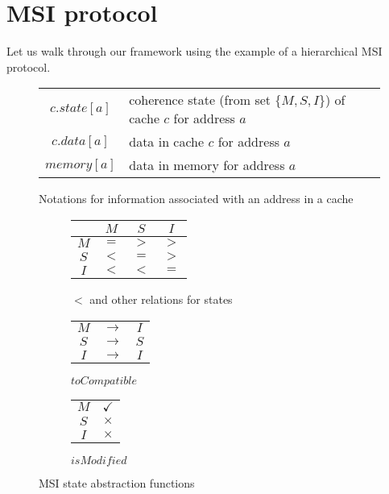 \section{MSI protocol}
\label{sec:GlobalMsi}

Let us walk through our framework using the example of a hierarchical MSI
protocol.


\begin{figure}
\begin{tabularx}{\linewidth}{|cX|}
\hline
$c.state[a]$ & coherence state (from set $\{M, S, I\}$) of cache $c$ for address $a$\\
$c.data[a]$ & data in cache $c$ for address $a$\\
$memory[a]$ & data in memory for address $a$\\
\hline
\end{tabularx}
\caption{Notations for information associated with an address in a cache}
\label{notation}
\end{figure}

\begin{figure}
\begin{subfigure}{.43\linewidth}
\centering
\begin{tabular}{|c|ccc|}
\hline
& $M$ & $S$ & $I$\\
\hline
$M$ & $=$ & $>$ & $>$\\
$S$ & $<$ & $=$ & $>$\\
$I$ & $<$ & $<$ & $=$\\
\hline
\end{tabular}
\caption{$<$ and other relations for states}
\label{msi<}
\end{subfigure}
\begin{subfigure}{.31\linewidth}
\centering
\begin{tabular}{|ccc|}
\hline
$M$ & $\rightarrow$ & $I$\\
$S$ & $\rightarrow$ & $S$\\
$I$ & $\rightarrow$ & $I$\\
\hline
\end{tabular}
\caption{$toCompatible$}
\label{toCompat}
\end{subfigure}
\begin{subfigure}{.22\linewidth}
\centering
\begin{tabular}{|c|c|}
\hline
$M$ & $\checkmark$\\
$S$ & $\times$\\
$I$ & $\times$\\
\hline
\end{tabular}
\caption{$isModified$}
\label{isModified}
\end{subfigure}
\caption{MSI state abstraction functions}
\label{funcs}
\end{figure}

